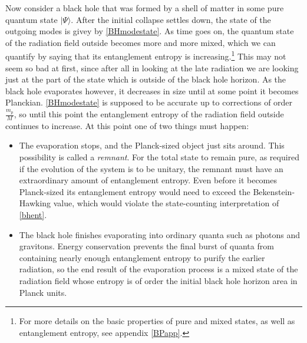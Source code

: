 \documentclass[12pt]{article}
\newcommand{\be}{\begin{equation}}
\newcommand{\ee}{\end{equation}}
\newcommand{\lan}{\langle}
\newcommand{\ran}{\rangle}
\begin{document}



Now consider a black hole that was formed by a shell of matter in some pure quantum state $|\Psi\ran$.  After the initial collapse settles down, the state of the outgoing modes is givey by \eqref{BHmodestate}.  As time goes on, the quantum state of the radiation field outside becomes more and more mixed, which we can quantify by saying that its entanglement entropy is increasing.\footnote{For more details on the basic properties of pure and mixed states, as well as entanglement entropy, see appendix \ref{BPapp}.}  This may not seem so bad at first, since after all in looking at the late radiation we are looking just at the part of the state which is outside of the black hole horizon.  As the black hole evaporates however, it decreases in size until at some point it becomes Planckian.  \eqref{BHmodestate} is supposed to be accurate up to corrections of order $\frac{m_p}{M}$, so until this point the entanglement entropy of the radiation field outside continues to increase.  At this point one of two things must happen:
\begin{itemize}
\item[(1)] The evaporation stops, and the Planck-sized object just sits around.  This possibility is called a \textit{remnant}.  For the total state to remain pure, as required if the evolution of the system is to be unitary, the remnant must have an extraordinary amount of entanglement entropy. Even before it becomes Planck-sized its entanglement entropy would need to exceed the Bekenstein-Hawking value, which would violate the state-counting interpretation of \eqref{bhent}.
\item[(2)] The black hole finishes evaporating into ordinary quanta such as photons and gravitons.  Energy conservation prevents the final burst of quanta from containing nearly enough entanglement entropy to purify the earlier radiation, so the end result of the evaporation process is a mixed state of the radiation field whose entropy is of order the initial black hole horizon area in Planck units. 
\end{itemize}
\end{document}

